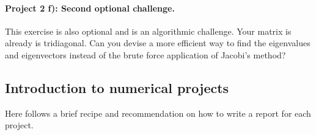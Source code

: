 \documentclass[%
oneside,                 %
final,                   %
10pt]{article}
\begin{document}
\paragraph{Project 2 f): Second optional challenge.}
This exercise is also optional and is an algorithmic challenge. Your matrix is already is tridiagonal. 
Can you devise a more efficient way to find the eigenvalues and eigenvectors instead of the brute force application of Jacobi's method? 



\subsection*{Introduction to numerical projects}

Here follows a brief recipe and recommendation on how to write a report for each
project.
\end{document}
